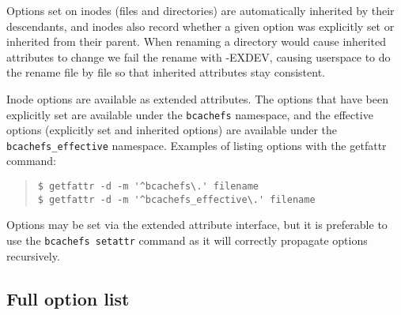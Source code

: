 \documentclass{article}
\begin{document}
Options set on inodes (files and directories) are automatically inherited by
their descendants, and inodes also record whether a given option was explicitly
set or inherited from their parent. When renaming a directory would cause
inherited attributes to change we fail the rename with -EXDEV, causing userspace
to do the rename file by file so that inherited attributes stay consistent.

Inode options are available as extended attributes. The options that have been
explicitly set are available under the \texttt{bcachefs} namespace, and the effective
options (explicitly set and inherited options) are available under the
\texttt{bcachefs\_effective} namespace. Examples of listing options with the
getfattr command:

\begin{quote} \begin{verbatim}
$ getfattr -d -m '^bcachefs\.' filename
$ getfattr -d -m '^bcachefs_effective\.' filename
\end{verbatim} \end{quote}

Options may be set via the extended attribute interface, but it is preferable to
use the \texttt{bcachefs setattr} command as it will correctly propagate options
recursively.

\subsection{Full option list}
\end{document}
